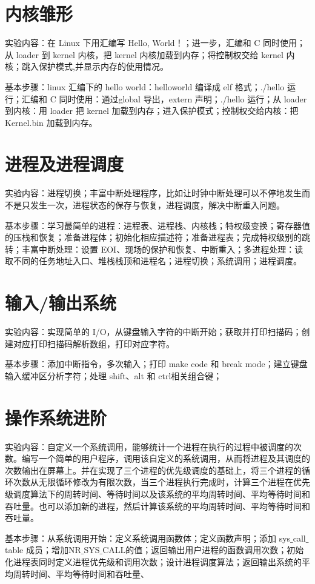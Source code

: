 \section{内核雏形}
实验内容：在 Linux 下用汇编写 Hello, World！；进一步，汇编和 C 同时使用；从 loader 到 kernel 内核，把 kernel 内核加载到内存；将控制权交给 kernel 内核；跳入保护模式,并显示内存的使用情况。\par
基本步骤：linux 汇编下的 hello world：helloworld 编译成 elf 格式；./hello 运行；汇编和 C 同时使用：通过global 导出，extern 声明；./hello 运行；从 loader 到内核：用 loader 把 kernel 加载到内存；进入保护模式；控制权交给内核：把 Kernel.bin 加载到内存。

\section{进程及进程调度}
实验内容：进程切换；丰富中断处理程序，比如让时钟中断处理可以不停地发生而不是只发生一次，进程状态的保存与恢复，进程调度，解决中断重入问题。\par
基本步骤：学习最简单的进程：进程表、进程栈、内核栈；特权级变换；寄存器值的压栈和恢复；准备进程体；初始化相应描述符；准备进程表；完成特权级别的跳转；丰富中断处理：设置 EOI、现场的保护和恢复、中断重入；多进程处理：读取不同的任务地址入口、堆栈栈顶和进程名；进程切换；系统调用；进程调度。

\section{输入/输出系统}
实验内容：实现简单的 I/O，从键盘输入字符的中断开始；获取并打印扫描码；创建对应打印扫描码解析数组，打印对应字符。\par
基本步骤：添加中断指令，多次输入；打印 make code 和 break mode；建立键盘输入缓冲区分析字符；处理 shift、alt 和 ctrl相关组合键；

\section{操作系统进阶}
实验内容：自定义一个系统调用，能够统计一个进程在执行的过程中被调度的次数。编写一个简单的用户程序，调用该自定义的系统调用，从而将进程及其调度的次数输出在屏幕上。并在实现了三个进程的优先级调度的基础上，将三个进程的循环次数从无限循环修改为有限次数，当三个进程执行完成时，计算三个进程在优先级调度算法下的周转时间、等待时间以及该系统的平均周转时间、平均等待时间和吞吐量。也可以添加新的进程，然后计算该系统的平均周转时间、平均等待时间和吞吐量。\par
基本步骤：从系统调用开始：定义系统调用函数体；定义函数声明；添加 sys$\_$call$\_$table 成员；增加NR$\_$SYS$\_$CALL的值；返回输出用户进程的函数调用次数；初始化进程表同时定义进程优先级和调用次数；设计进程调度算法；返回输出系统的平均周转时间、平均等待时间和吞吐量、
